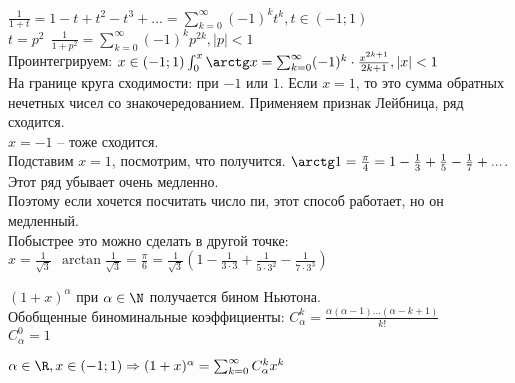 \begin{Prop}
	$\frac{1}{1 + t} = 1 - t + t^2 - t^3 + ... = \sum_{k=0}^{\infty} (-1)^k t^k, t \in (-1;1)$\\
	$t = p^2 \ \ \frac{1}{1+ p^2} = \sum_{k=0}^{\infty} (-1)^k p^{2k}, |p| < 1$\\
	Проинтегрируем: $x \in (-1;1) \int_{0}^{x} \arctg x = \sum_{k=0}^{\infty} (-1)^k \cdot \frac{x^{2k+1}}{2k+1}, |x| < 1$\\
	На границе круга сходимости: при $-1$ или $1$. Если $x = 1$, то это сумма обратных нечетных чисел со знакочередованием. 
	Применяем признак Лейбница, ряд сходится.\\
	$x = -1$ -- тоже сходится.\\
	Подставим $x = 1$, посмотрим, что получится. $\arctg 1 = \frac{\pi}{4} = 1 - \frac{1}{3} + \frac{1}{5} - \frac{1}{7} + ... $. Этот ряд убывает очень медленно.\\
	Поэтому если хочется посчитать число пи, этот способ работает, но он медленный.\\
	Побыстрее это можно сделать в другой точке: $x = \frac{1}{\sqrt{3}} \ \ \arctan \frac{1}{\sqrt{3}} = \frac{\pi}{6} = \frac{1}{\sqrt{3}} (1 - \frac{1}{3 \cdot 3} + \frac{1}{5 \cdot 3^2} - \frac{1}{7 \cdot 3^3})$
\end{Prop}


\begin{Def} 
	$(1+x)^{\alpha}$ при $\alpha \in \N$ получается бином Ньютона.\\ 
	Обобщенные биноминальные коэффициенты: $C_{\alpha}^{k} = \frac{\alpha(\alpha-1)...(\alpha-k+1)}{k!}$\\
	$C_{\alpha}^{0}=1$
\end{Def} 

\begin{Thm} 
    $\alpha \in \R, x \in (-1; 1) \Rightarrow (1+x)^{\alpha} = \sum_{k=0}^{\infty} C_{\alpha}^{k} x^k$
\end{Thm} 

